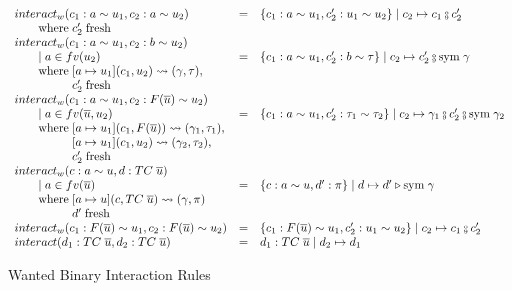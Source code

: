 \begin{figure}
\[
\begin{array}{l c l}
interact_w(c_1 : a \sim u_1, c_2 : a \sim u_2) &=& \{c_1 : a \sim u_1, c_2' :
u_1 \sim u_2\} \mid c_2 \mapsto c_1 \fctrans c_2'
\\ \where c_2' \; \text{fresh}
\\
interact_w(c_1 : a \sim u_1, c_2 : b \sim u_2)
\\ \guard a \in fv(u_2 )&=& \{c_1 : a  \sim u_1, c_2' : b \sim \tau\} \mid
c_2 \mapsto c_2' \fctrans \text{sym} \; \gamma
\\ \where [a \mapsto u_1](c_1, u_2) \rightsquigarrow (\gamma, \tau),
\\ \whereindent c_2' \; \text{fresh}
\\
interact_w(c_1 : a \sim u_1, c_2 : F(\overline{u}) \sim u_2)
\\ \guard a \in fv(\overline{u}, u_2) &=& \{c_1 : a \sim u_1, c_2' : \tau_1
\sim \tau_2\} \mid c_2 \mapsto \gamma_1 \fctrans c_2' \fctrans \text{sym} \;
\gamma_2
\\ \where [a \mapsto u_1](c_1, F(\overline{u})) \rightsquigarrow
(\gamma_1, \tau_1),
\\ \whereindent [a \mapsto u_1](c_1, u_2) \rightsquigarrow
(\gamma_2, \tau_2),
\\ \whereindent c_2' \; \text{fresh}
\\
interact_w(c : a \sim u, d : TC \; \overline{u})
\\ \guard a \in fv(\overline{u}) &=& \{c : a \sim u, d' : \pi\} \mid d
\mapsto d' \triangleright \text{sym} \; \gamma
\\ \where [a \mapsto u](c, TC \; \overline{u}) \rightsquigarrow
(\gamma, \pi)
\\ \whereindent d' \; \text{fresh}
\\
interact_w(c_1 : F(\overline{u}) \sim u_1, c_2 : F(\overline{u}) \sim u_2) &=&
\{c_1 : F(\overline{u}) \sim u_1, c_2' : u_1 \sim u_2\} \mid c_2 \mapsto c_1
\fctrans c_2'
\\
interact (d_1 : TC \; \overline{u}, d_2 : TC \; \overline{u}) &=& d_1 : TC \;
\overline{u} \mid d_2 \mapsto d_1
\end{array}
\]
\caption{Wanted Binary Interaction Rules}
\end{figure}
